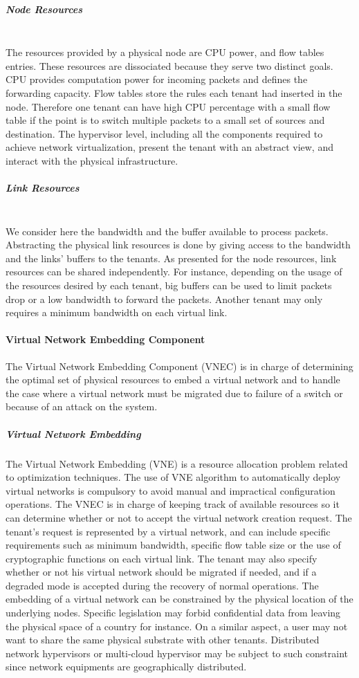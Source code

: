 \subparagraph{\textbf{Node Resources}}\textbf{}\\
The resources provided by a physical node are CPU power, and flow tables entries.
These resources are dissociated because they serve two distinct goals.
CPU provides computation power for incoming packets and defines the forwarding capacity.
Flow tables store the rules each tenant had inserted in the node.
Therefore one tenant can have high CPU percentage with a small flow table if the point is to switch multiple packets to a small set of sources and destination.
The hypervisor level, including all the components required to achieve network virtualization, present the tenant with an abstract view, and interact with the physical infrastructure.

\subparagraph{\textbf{Link Resources}}\textbf{}\\
We consider here the bandwidth and the buffer available to process packets.
Abstracting the physical link resources is done by giving access to the bandwidth and the links' buffers to the tenants.
As presented for the node resources, link resources can be shared independently.
For instance, depending on the usage of the resources desired by each tenant, big buffers can be used to limit packets drop or a low bandwidth to forward the packets.
Another tenant may only requires a minimum bandwidth on each virtual link.

\paragraph{Virtual Network Embedding Component}

The Virtual Network Embedding Component (VNEC) is in charge of determining the optimal set of physical resources to embed a virtual network and to handle the case where a virtual network must be migrated due to failure of a switch or because of an attack on the system.

\subparagraph{Virtual Network Embedding}
The Virtual Network Embedding (VNE) is a resource allocation problem related to optimization techniques.
The use of VNE algorithm to automatically deploy virtual networks is compulsory to avoid manual and impractical configuration operations.
The VNEC is in charge of keeping track of available resources so it can determine whether or not to accept the virtual network creation request.
The tenant's request is represented by a virtual network, and can include specific requirements such as minimum bandwidth, specific flow table size or the use of cryptographic functions on each virtual link.
The tenant may also specify whether or not his virtual network should be migrated if needed, and if a degraded mode is accepted during the recovery of normal operations.
The embedding of a virtual network can be constrained by the physical location of the underlying nodes.
Specific legislation may forbid confidential data from leaving the physical space of a country for instance.
On a similar aspect, a user may not want to share the same physical substrate with other tenants.
Distributed network hypervisors or multi-cloud hypervisor may be subject to such constraint since network equipments are geographically distributed.


